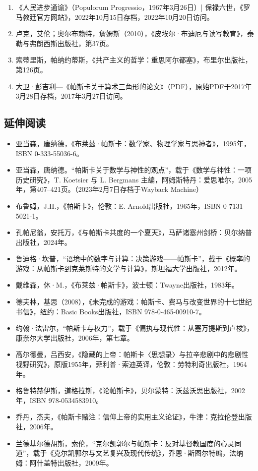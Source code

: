 \begin{enumerate}
\item 《人民进步通谕》（Populorum Progressio，1967年3月26日）| 保禄六世，《罗马教廷官方网站》，2022年10月15日存档，2022年10月20日访问。
\item 卢克，艾伦；奥尔布赖特，詹姆斯（2010），《皮埃尔·布迪厄与读写教育》，泰勒与弗朗西斯出版社，第37页。
\item 索蒂里斯，帕纳约蒂斯，《共产主义的哲学：重思阿尔都塞》，布里尔出版社，第126页。
\item 大卫·彭吉利—《帕斯卡关于算术三角形的论文》（PDF），原始PDF于2017年3月28日存档，2017年3月27日访问。
\end{enumerate}
\subsection{延伸阅读}
\begin{itemize}
\item 亚当森，唐纳德，《布莱兹·帕斯卡：数学家、物理学家与思神者》，1995年，ISBN 0-333-55036-6。
\item 亚当森，唐纳德。“帕斯卡关于数学与神性的观点”，载于《数学与神性：一项历史研究》，T. Koetsier 与 L. Bergmans 主编，阿姆斯特丹：爱思唯尔，2005年，第407–421页。（2023年2月7日存档于Wayback Machine）
\item 布鲁姆，J.H.，《帕斯卡》，伦敦：E. Arnold出版社，1965年，ISBN 0-7131-5021-1。
\item 孔帕尼翁，安托万，《与帕斯卡共度的一个夏天》，马萨诸塞州剑桥：贝尔纳普出版社，2024年。
\item 鲁迪格·坎普，“语境中的数字与计算：决策游戏——帕斯卡”，载于《概率的游戏：从帕斯卡到克莱斯特的文学与计算》，斯坦福大学出版社，2012年。
\item 戴维森，休·M.，《布莱兹·帕斯卡》，波士顿：Twayne出版社，1983年。
\item 德夫林，基思（2008），《未完成的游戏：帕斯卡、费马与改变世界的十七世纪书信》，纽约：Basic Books出版社，ISBN 978-0-465-00910-7。
\item 约翰·法雷尔，“帕斯卡与权力”，载于《偏执与现代性：从塞万提斯到卢梭》，康奈尔大学出版社，2006年，第七章。
\item 高尔德曼，吕西安，《隐藏的上帝：帕斯卡〈思想录〉与拉辛悲剧中的悲剧性视野研究》，原版1955年，菲利普·索迪英译，伦敦：劳特利奇出版社，1964年。
\item 格鲁特赫伊斯，道格拉斯，《论帕斯卡》，贝尔蒙特：沃兹沃思出版社，2002年，ISBN 978-0534583910。
\item 乔丹，杰夫，《帕斯卡赌注：信仰上帝的实用主义论证》，牛津：克拉伦登出版社，2006年。
\item 兰德基尔德胡斯，索伦，“克尔凯郭尔与帕斯卡：反对基督教国度的心灵同道”，载于《克尔凯郭尔与文艺复兴及现代传统》，乔恩·斯图尔特编，法纳姆：阿什盖特出版社，2009年。

\end{itemize}
